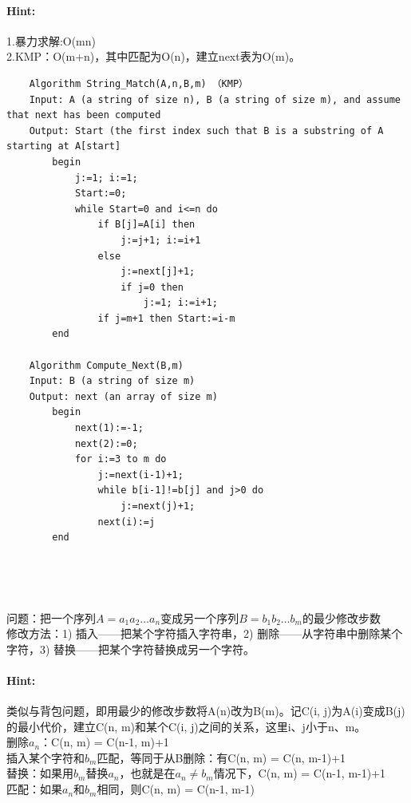 \documentclass{article}
\begin{document}
     \paragraph{Hint:}1.暴力求解:O(mn)\\
    2.KMP：O(m+n)，其中匹配为O(n)，建立next表为O(m)。
    \lstset{language=C}
    \begin{lstlisting}
    Algorithm String_Match(A,n,B,m) （KMP）
    Input: A (a string of size n), B (a string of size m), and assume that next has been computed
    Output: Start (the first index such that B is a substring of A starting at A[start]
        begin
            j:=1; i:=1;
            Start:=0;
            while Start=0 and i<=n do
                if B[j]=A[i] then
                    j:=j+1; i:=i+1
                else
                    j:=next[j]+1;
                    if j=0 then
                        j:=1; i:=i+1;
                if j=m+1 then Start:=i-m
        end
        
    Algorithm Compute_Next(B,m)
    Input: B (a string of size m)
    Output: next (an array of size m)
        begin
            next(1):=-1;
            next(2):=0;
            for i:=3 to m do
                j:=next(i-1)+1;
                while b[i-1]!=b[j] and j>0 do
                    j:=next(j)+1;
                next(i):=j
        end

        
        
\end{lstlisting}
     \subsubsection{}问题：把一个序列$A=a_{1}a_2…a_n$变成另一个序列$B=b_1b_2…b_m$的最少修改步数\\
     修改方法：1) 插入——把某个字符插入字符串，2) 删除——从字符串中删除某个字符，3) 替换——把某个字符替换成另一个字符。
     
     \paragraph{Hint:}类似与背包问题，即用最少的修改步数将A(n)改为B(m)。记C(i, j)为A(i)变成B(j)的最小代价，建立C(n, m)和某个C(i, j)之间的关系，这里i、j小于n、m。\\
      删除$a_n$：C(n, m) = C(n-1, m)+1\\
      插入某个字符和$b_m$匹配，等同于从B删除：有C(n, m) = C(n, m-1)+1\\
      替换：如果用$b_m$替换$a_n$，也就是在$a_n \ne b_m$情况下，C(n, m) = C(n-1, m-1)+1\\
    匹配：如果$a_n$和$b_m$相同，则C(n, m) = C(n-1, m-1)\\
    
\end{document}
